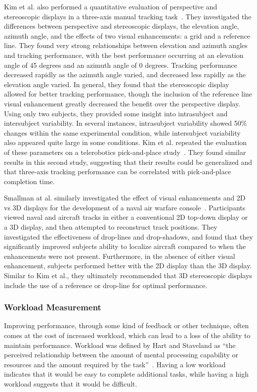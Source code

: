 Kim et al. also performed a quantitative evaluation of perspective and stereoscopic displays in a three-axis manual tracking task~\citep{kim_quantitative_1987}.
They investigated the differences between perspective and stereoscopic displays, the elevation angle, azimuth angle, and the effects of two visual enhancements: a grid and a reference line.
They found very strong relationships between elevation and azimuth angles and tracking performance, with the best performance occurring at an elevation angle of 45 degrees and an azimuth angle of 0 degrees.
Tracking performance decreased rapidly as the azimuth angle varied, and decreased less rapidly as the elevation angle varied.
In general, they found that the stereoscopic display allowed for better tracking performance, though the inclusion of the reference line visual enhancement greatly decreased the benefit over the perspective display.
Using only two subjects, they provided some insight into intrasubject and intersubject variability.
In several instances, intrasubject variability showed 50\% changes within the same experimental condition, while intersubject variability also appeared quite large in some conditions.
Kim et al. repeated the evaluation of these parameters on a telerobotics pick-and-place study~\citep{kim_visual_1987}.
They found similar results in this second study, suggesting that their results could be generalized and that three-axis tracking performance can be correlated with pick-and-place completion time.

Smallman at al. similarly investigated the effect of visual enhancements and 2D vs 3D displays for the development of a naval air warfare console~\citep{smallman_track_2000}.
Participants viewed naval and aircraft tracks in either a conventional 2D top-down display or a 3D display, and then attempted to reconstruct track positions.
They investigated the effectiveness of drop-lines and drop-shadows, and found that they significantly improved subjects ability to localize aircraft compared to when the enhancements were not present.
Furthermore, in the absence of either visual enhancement, subjects performed better with the 2D display than the 3D display.
Similar to Kim et al., they ultimately recommended that 3D stereoscopic displays include the use of a reference or drop-line for optimal performance.

\subsubsection{Workload Measurement}
Improving performance, through some kind of feedback or other technique, often comes at the cost of increased workload, which can lead to a loss of the ability to maintain performance.
Workload was defined by Hart and Staveland as ``the perceived relationship between the amount of mental processing capability or resources and the amount required by the task''~\citep{hart_development_1988}.
Having a low workload indicates that it would be easy to complete additional tasks, while having a high workload suggests that it would be difficult.

